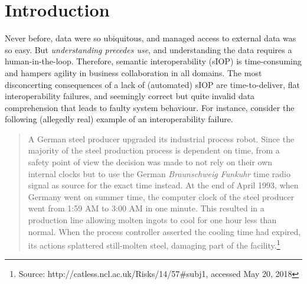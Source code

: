 \documentclass[sort&compress,preprint,authoryear,3p,twocolumn]{elsarticle}
\begin{document}
\hypertarget{introduction}{%
\section{Introduction}\label{introduction}}

Never before, data were so ubiquitous, and managed access to external
data was so easy. But \emph{understanding precedes use}, and
understanding the data requires a human-in-the-loop. Therefore, semantic
interoperability (sIOP) is time-consuming and hampers agility in
business collaboration in all domains. The most disconcerting
consequences of a lack of (automated) sIOP are time-to-deliver, flat
interoperability failures, and seemingly correct but quite invalid data
comprehension that leads to faulty system behaviour. For instance,
consider the following (allegedly real) example of an interoperability
failure.

\begin{quote}
A German steel producer upgraded its industrial process robot. Since the
majority of the steel production process is dependent on time, from a
safety point of view the decision was made to not rely on their own
internal clocks but to use the German \emph{Braunschweig Funkuhr} time
radio signal as source for the exact time instead. At the end of April
1993, when Germany went on summer time, the computer clock of the steel
producer went from 1:59 AM to 3:00 AM in one minute. This resulted in a
production line allowing molten ingots to cool for one hour less than
normal. When the process controller asserted the cooling time had
expired, its actions splattered still-molten steel, damaging part of the
facility.\footnote{Source: http://catless.ncl.ac.uk/Risks/14/57\#subj1,
  accessed May 20, 2018}
\end{quote}
\end{document}
